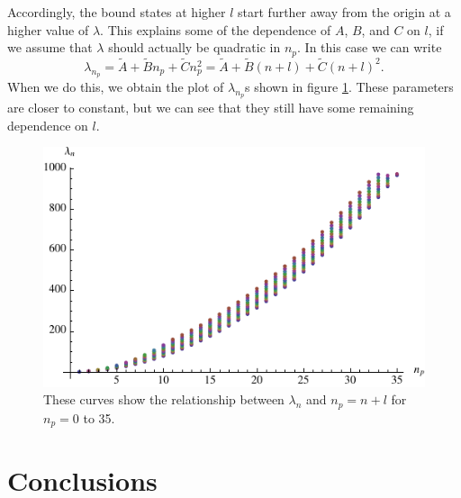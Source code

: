 \documentclass[12pt,twoside]{reedthesis}
\newcommand{\eqn}[1]{\begin{equation}#1\end{equation}}
\begin{document}
Accordingly, the bound states at higher $l$ start further away from the origin at a higher value of $\lambda$. 
This explains some of the dependence of $A$, $B$, and $C$ on $l$, if we assume that $\lambda$ should actually be quadratic in $n_p$. In this case we can write
\eqn{
\lambda_{n_p} = \tilde{A} + \tilde{B} n_p + \tilde{C} n_p^2 = \tilde{A} + \tilde{B} (n + l) + \tilde{C} (n + l)^2\mbox{.}
}
When we do this, we obtain the plot of $\lambda_{n_p}$s shown in figure \ref{fig:alllcs-principal}. These parameters are closer to constant, but we can see that they still have some remaining dependence on $l$.
\begin{figure}[h]
\centering
\includegraphics[scale=0.96]{Figures/alllcs-principal}
\caption[Plots of $\lambda_n$ versus $n + l$ for $l = 0$ to $10$]{These curves show the relationship between $\lambda_n$ and $n_p = n + l$ for $n_p = 0$ to 35.}
\label{fig:alllcs-principal}
\end{figure}


%
%
\chapter*{Conclusions}
	\setcounter{chapter}{4}
	\setcounter{section}{0}
\end{document}
